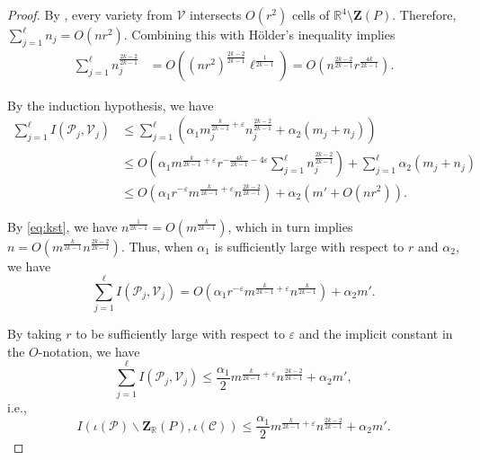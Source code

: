 \documentclass[letterpaper, reqno,11pt]{article}
\theoremstyle{remark}
\newcommand{\RR}{\mathbb{R}}
\newcommand{\BZ}{\mathbf{Z}}
\newcommand{\pts}{\mathcal P}
\newcommand{\vrts}{\mathcal V}
\newcommand{\curves}{\mathcal C}
\newcommand{\eps}{\varepsilon}
\begin{document}
\begin{proof}
By \cite[Theorem A.2]{ST}, every variety from $\vrts$ intersects $O(r^2)$ cells of $\RR^4\setminus \BZ(P)$.
Therefore, $\sum_{j=1}^{\ell} n_j = O\left(nr^2\right)$. Combining this with H\"older's inequality implies
\begin{align*}
\sum_{j=1}^{\ell} n_j^{\frac{2k-2}{2k-1}} &
=O\left(\left(nr^{2}\right)^{\frac{2k-2}{2k-1}}\ell^{\frac{1}{2k-1}}\right) =O\left(n^{\frac{2k-2}{2k-1}}r^{\frac{4k}{2k-1}}\right).
\end{align*}

By the induction hypothesis, we have
\begin{align*}
\sum_{j=1}^{\ell} I(\pts_j,\vrts_j) &\le \sum_{j=1}^{\ell} \left(\alpha_{1} m_j^{\frac{k}{2k-1}+\eps}n_j^{\frac{2k-2}{2k-1}}+\alpha_{2}(m_j+n_j)\right) \\
&\le O\left(\alpha_{1} m^{\frac{k}{2k-1}+\eps}r^{-\frac{4k}{2k-1}-4\eps} \sum_{j=1}^{\ell} n_j^{\frac{2k-2}{2k-1}} \right) + \sum_{j=1}^{\ell}\alpha_{2}(m_j+n_j) \\[2mm]
&\le O\left(\alpha_{1} r^{-\varepsilon}m^{\frac{k}{2k-1}+\eps}n^{\frac{2k-2}{2k-1}}   \right) + \alpha_{2}\left(m'+O\left(nr^2\right)\right).
\end{align*}

By \eqref{eq:kst}, we have $n^{\frac{1}{2k-1}}=O\left(m^{\frac{k}{2k-1}}\right)$, which in turn implies $n=O\left(m^{\frac{k}{2k-1}}n^{\frac{2k-2}{2k-1}}\right)$.
Thus, when $\alpha_{1}$ is sufficiently large with respect to $r$ and $\alpha_{2}$, we have
\begin{equation*}
\sum_{j=1}^{\ell} I(\pts_j,\vrts_j) = O\left(\alpha_{1} r^{-\varepsilon}m^{\frac{k}{2k-1}+\varepsilon}n^{\frac{k}{2k-1}} \right) + \alpha_{2}m'.
\end{equation*}

By taking $r$ to be sufficiently large with respect to $\eps$ and the implicit constant in the $O$-notation, we have
\begin{equation*}
\sum_{j=1}^{\ell} I(\pts_j,\vrts_j) \le \frac{\alpha_{1}}{2} m^{\frac{k}{2k-1}+\eps}n^{\frac{2k-2}{2k-1}} + \alpha_{2}m',
\end{equation*}
i.e.,
\begin{equation}\label{eq:incCells}
I(\iota(\pts)\backslash\BZ_{\RR}(P),\iota(\curves))\le \frac{\alpha_{1}}{2} m^{\frac{k}{2k-1}+\eps}n^{\frac{2k-2}{2k-1}} + \alpha_{2}m'.
\end{equation}


\end{proof}
\end{document}
